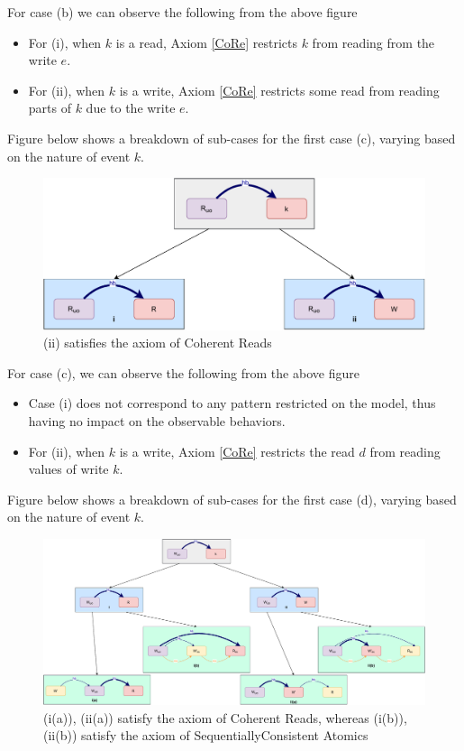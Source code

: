     For case (b) we can observe the following from the above figure 
    \begin{itemize}
        \item For (i), when $k$ is a read, Axiom \ref{CoRe} restricts $k$ from reading from the write $e$. 
        \item For (ii), when $k$ is a write, Axiom \ref{CoRe} restricts some read from reading parts of $k$ due to the write $e$.   
    \end{itemize}

    Figure below shows a breakdown of sub-cases for the first case (c), varying based
    on the nature of event $k$.
    \begin{figure}[H]
        \centering
        \includegraphics[scale=0.6]{5.InstructionReordering/4.ValidReorderingCandidate/ProofParts/Part4/part4(c).pdf}
        \caption{(ii) satisfies the axiom of Coherent Reads}
        \label{fig:my_label}
    \end{figure}
    
    For case (c), we can observe the following from the above figure
    \begin{itemize}
        \item Case (i) does not correspond to any pattern restricted on the model, thus having no impact on the observable behaviors. 
        \item For (ii), when $k$ is a write, Axiom \ref{CoRe} restricts the read $d$ from reading values of write $k$. 
    \end{itemize}

    Figure below shows a breakdown of sub-cases for the first case (d), varying based
    on the nature of event $k$.
    \begin{figure}[H]
        \centering
        \includegraphics[scale=0.4]{5.InstructionReordering/4.ValidReorderingCandidate/ProofParts/Part4/part4(d).pdf}
        \caption{(i(a)), (ii(a)) satisfy the axiom of Coherent Reads, whereas (i(b)), (ii(b)) satisfy the axiom of SequentiallyConsistent Atomics}
        \label{fig:my_label}
    \end{figure}

